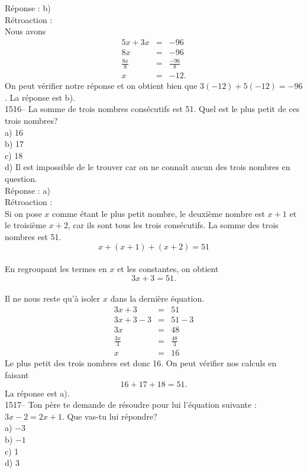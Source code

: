 R\'eponse : b)\\

R\'etroaction :\\
Nous avons
\begin{eqnarray*}
5x+3x&=&-96 \\ 8x&=&-96 \\[3mm]\frac{8x}{8}&=& \frac{-96}{8}\\[3mm]
x&=&-12.
\end{eqnarray*}
On peut v\'erifier notre r\'eponse et on obtient bien que
$3(-12)+5(-12)=-96$. La r\'eponse est b).\\

1516-- La somme de trois nombres cons\'ecutifs est 51. Quel est le
plus petit
de ces trois nombres?\\
a) 16\\
b) 17\\
c) 18\\
d) Il est impossible de le trouver car on ne conna\^it aucun des trois
nombres en question.\\

R\'eponse : a)\\

R\'etroaction :\\
Si on pose $x$ comme \'etant le plus petit nombre, le deuxi\`eme
nombre est $x+1$ et le troisi\`eme $x+2$, car ils sont tous les
trois cons\'ecutifs. La somme des trois nombres est 51.
$$x+(x+1)+(x+2)=51$$\\ En regroupant les termes en $x$ et les
constantes, on obtient $$3x+3=51.$$\\Il ne nous reste qu'\`a isoler
$x$ dans la derni\`ere \'equation.
\begin{eqnarray*}
3x+3&=&51 \\ 3x+3-3&=&51-3 \\ 3x&=&48 \\[3mm]
\frac{3x}{3}&=&\frac{48}{3}\\[3mm] x&=&16
\end{eqnarray*}
Le plus petit des trois nombres est donc 16. On peut v\'erifier nos calculs
en faisant $$16+17+18=51.$$ La r\'eponse est a).\\

1517-- Ton p\`ere te demande de r\'esoudre pour lui l'\'equation
suivante : $3x-2=2x+1$. Que vas-tu lui r\'epondre?\\
a) $-3$\\
b) $-1$\\
c) 1\\
d) 3\\

